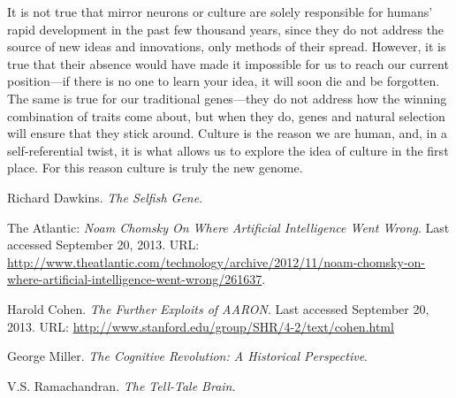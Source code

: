 \documentclass[11pt,a4paper]{article}
\begin{document}
It is not true that mirror neurons or culture are solely responsible for humans’ rapid development in the past few thousand years, since they do not address the source of new ideas and innovations, only methods of their spread. However, it is true that their absence would have made it impossible for us to reach our current position---if there is no one to learn your idea, it will soon die and be forgotten. The same is true for our traditional genes---they do not address how the winning combination of traits come about, but when they do, genes and natural selection will ensure that they stick around. Culture is the reason we are human, and, in a self-referential twist, it is what allows us to explore the idea of culture in the first place. For this reason culture is truly the new genome.



\vspace{0.75cm}


\begin{center}
\end{center}

\newpage
\color{spot}
\begin{thebibliography}{99}
\color{black}

 Richard Dawkins. \emph{The Selfish Gene}.

 The Atlantic:
\emph{Noam Chomsky On Where Artificial Intelligence Went Wrong}. Last accessed September 20, 2013. URL: \url{http://www.theatlantic.com/technology/archive/2012/11/noam-chomsky-on-where-artificial-intelligence-went-wrong/261637}.

Harold Cohen. \emph{The Further Exploits of AARON}. Last accessed September 20, 2013. URL: \url{http://www.stanford.edu/group/SHR/4-2/text/cohen.html}

George Miller. \emph{The Cognitive Revolution: A Historical Perspective}.

 V.S. Ramachandran. \emph{The Tell-Tale Brain}.

\end{thebibliography}
\end{document}
